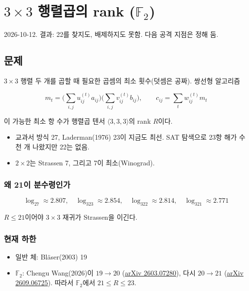 \section{\texorpdfstring{\(3\times3\) 행렬곱의 rank (\(\mathbb F_2\))}{3×3 행렬곱의 rank (F2)}}

2026-10-12. 결과: 22를 찾지도, 배제하지도 못함. 다음 공격 지점은 정해
둠.

\subsection{문제}

\(3\times3\) 행렬 두 개를 곱할 때 필요한 곱셈의 최소 횟수(덧셈은 공짜).
쌍선형 알고리즘

\[
m_t=\Big(\sum_{i,j}u^{(t)}_{ij}a_{ij}\Big)\Big(\sum_{i,j}v^{(t)}_{ij}b_{ij}\Big),\qquad c_{ij}=\sum_tw^{(t)}_{ij}m_t
\]

이 가능한 최소 항 수가 행렬곱 텐서 \(\langle3,3,3\rangle\)의 rank
\(R\)이다.

\begin{itemize}
\tightlist
\item
  교과서 방식 27, Laderman(1976) 23이 지금도 최선. SAT 탐색으로 23항
  해가 수천 개 나왔지만 22는 없음.
\item
  \(2\times2\)는 Strassen 7, 그리고 7이 최소(Winograd).
\end{itemize}

\subsubsection{왜 21이 분수령인가}

\[
\log_27\approx2.807,\quad\log_323\approx2.854,\quad\log_322\approx2.814,\quad\log_321\approx2.771
\]

\(R\le21\)이어야 \(3\times3\) 재귀가 Strassen을 이긴다.

\subsubsection{현재 하한}

\begin{itemize}
\tightlist
\item
  일반 체: Bläser(2003) 19
\item
  \(\mathbb F_2\): Chengu Wang(2026)이 \(19\to20\)
  (\href{https://arxiv.org/abs/2603.07280}{arXiv 2603.07280}), 다시
  \(20\to21\) (\href{https://arxiv.org/abs/2609.06725}{arXiv
  2609.06725}). 따라서 \(\mathbb F_2\)에서 \(21\le R\le23\).
\end{itemize}

